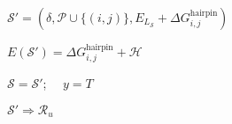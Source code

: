 \begin{algorithm}[t]
\begin{algorithmic}[1]
		\EndIf
		\EndIf
		\EndFor
		
		
		
		\State$\mathcal{S}' = (\delta, \mathcal{P} \cup \{(i,j)\}, E_{L_{\mathcal{S}}} + \Delta G_{i,j}^\text{hairpin} )$ 
		
		\State $E(\mathcal{S}')  = \Delta G_{i,j}^\text{hairpin} + \mathcal{H} $
		
		
		
		
		
		
		\State $\mathcal{S} = \mathcal{S}'$; \ \  $y = T$
		
		\Else
		
		\State $\mathcal{S}' \Rightarrow \mathcal{R}_u$		
		\EndIf
		
		
		\EndIf
		\EndIf
		
		
		
		
	\end{algorithmic}
\end{algorithm}

